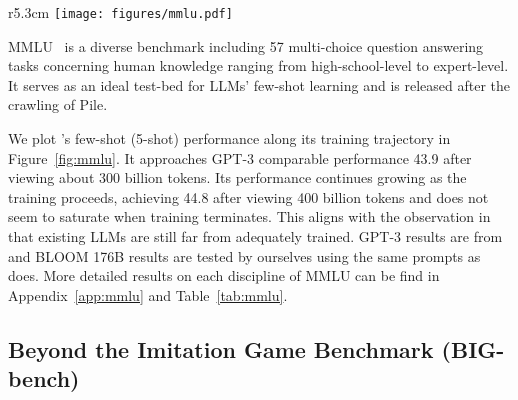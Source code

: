 {\begin{wrapfigure}{r}{5.3cm}
    \small
    \vspace{-4mm}
    \centering
    \texttt{[image: figures/mmlu.pdf]}
    \vspace{-4mm}
    \caption{\glm on MMLU (57 tasks) along its training trajectory.}
    \label{fig:mmlu}
    \vspace{-6mm}
\end{wrapfigure}

MMLU~\citep{hendrycks2021measuring} is a diverse benchmark including 57 multi-choice question answering tasks concerning human knowledge ranging from high-school-level to expert-level. 
It serves as an ideal test-bed for LLMs' few-shot learning and is released after the crawling of Pile.

We plot \glm's few-shot (5-shot) performance along its training trajectory in Figure~\ref{fig:mmlu}. 
It approaches GPT-3 comparable performance 43.9 after viewing about 300 billion tokens. 
Its performance continues growing as the training proceeds, achieving 44.8 after viewing 400 billion tokens and does not seem to saturate when training terminates.
This aligns with the observation in~\citep{hoffmann2022training} that existing LLMs are still far from adequately trained.
GPT-3 results are from~\citep{hendrycks2021measuring} and BLOOM 176B results are tested by ourselves using the same prompts as \glm does.
More detailed results on each discipline of MMLU can be find in Appendix~\ref{app:mmlu} and Table~\ref{tab:mmlu}.

\subsection{Beyond the Imitation Game Benchmark (BIG-bench)}

}
